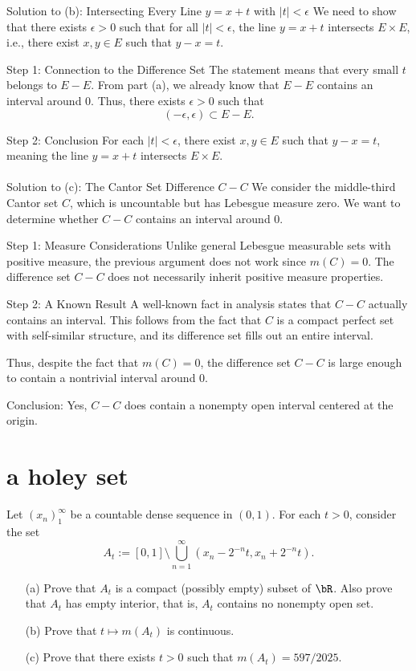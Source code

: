 \documentclass[lang=cn,11pt]{elegantbook}
\begin{document}
Solution to (b): Intersecting Every Line \( y = x + t \) with \( |t| < \epsilon \)
We need to show that there exists \( \epsilon > 0 \) such that for all \( |t| < \epsilon \), the line \( y = x + t \) intersects \( E \times E \), i.e., there exist \( x, y \in E \) such that \( y - x = t \).

Step 1: Connection to the Difference Set
The statement means that every small \( t \) belongs to \( E - E \). From part (a), we already know that \( E - E \) contains an interval around 0. Thus, there exists \( \epsilon > 0 \) such that
\[
(-\epsilon, \epsilon) \subset E - E.
\]

Step 2: Conclusion
For each \( |t| < \epsilon \), there exist \( x, y \in E \) such that \( y - x = t \), meaning the line \( y = x + t \) intersects \( E \times E \).\\\\





Solution to (c): The Cantor Set Difference \( C - C \)
We consider the middle-third Cantor set \( C \), which is uncountable but has Lebesgue measure zero. We want to determine whether \( C - C \) contains an interval around 0.

Step 1: Measure Considerations
Unlike general Lebesgue measurable sets with positive measure, the previous argument does not work since \( m(C) = 0 \). The difference set \( C - C \) does not necessarily inherit positive measure properties.

Step 2: A Known Result
A well-known fact in analysis states that \( C - C \) actually contains an interval. This follows from the fact that \( C \) is a compact perfect set with self-similar structure, and its difference set fills out an entire interval.

Thus, despite the fact that \( m(C) = 0 \), the difference set \( C - C \) is large enough to contain a nontrivial interval around 0.

Conclusion: Yes, \( C - C \) does contain a nonempty open interval centered at the origin.


\section{a holey set}
  Let $(x_n)_1^\infty$ be a countable dense sequence in $(0,1)$. For each $t>0$, consider the set
  \[
    A_t:=[0,1]\setminus\bigcup_{n=1}^\infty(x_n-2^{-n}t,x_n+2^{-n}t).
  \]
  \begin{itemize}
  \item[(a)]
  Prove that $A_t$ is a compact (possibly empty) subset of $\bR$. Also prove that $A_t$ has empty interior, that is, $A_t$ contains no nonempty open set.
\item[(b)]
  Prove that $t\mapsto m(A_t)$ is continuous.
\item[(c)]
  Prove that there exists $t>0$ such that $m(A_t)=597/2025$.
\end{itemize}
\end{document}
